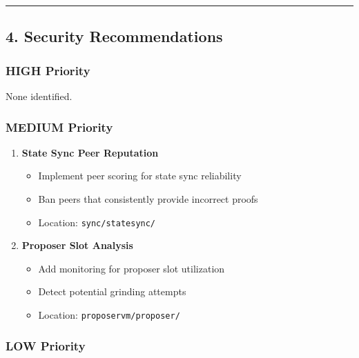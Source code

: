 \documentclass[
]{article}
\providecommand{\tightlist}{%
  \setlength{\itemsep}{0pt}\setlength{\parskip}{0pt}}
\begin{document}
\begin{center}\rule{0.5\linewidth}{0.5pt}\end{center}

\subsection{4. Security
Recommendations}\label{4-security-recommendations}

\subsubsection{HIGH Priority}\label{high-priority}

None identified.

\subsubsection{MEDIUM Priority}\label{medium-priority}

\begin{enumerate}
\def\labelenumi{\arabic{enumi}.}
\item
  \textbf{State Sync Peer Reputation}

  \begin{itemize}
  \tightlist
  \item
    Implement peer scoring for state sync reliability
  \item
    Ban peers that consistently provide incorrect proofs
  \item
    Location: \texttt{sync/statesync/}
  \end{itemize}
\item
  \textbf{Proposer Slot Analysis}

  \begin{itemize}
  \tightlist
  \item
    Add monitoring for proposer slot utilization
  \item
    Detect potential grinding attempts
  \item
    Location: \texttt{proposervm/proposer/}
  \end{itemize}
\end{enumerate}

\subsubsection{LOW Priority}\label{low-priority}
\end{document}
